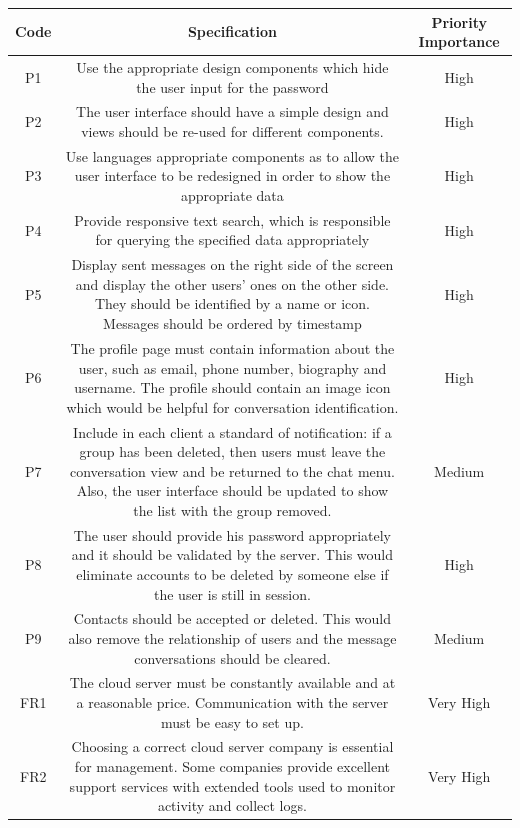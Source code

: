 \documentclass{article}
\begin{document}
\begin{table}[H]
	\centering
\begin{tabularx}{17cm}{|c|C|c|}
	\hline
	\textbf{Code} & \textbf{Specification} & \textbf{Priority Importance} \\ \hline
	\hline
		P1&Use the appropriate design components which hide the user input for  the password&High      \\ \hline
	P2&The user interface should have a simple design and views should be re-used for different components. &High          \\ \hline
	P3&Use languages appropriate components as to allow the user interface to be redesigned in order to show the appropriate data  & High     \\ \hline
	P4&Provide responsive text search, which is responsible for querying the specified data appropriately &High      \\ \hline
	P5&Display sent messages on the right side of the screen and display the other users' ones on the other side. They should be identified by a name or icon. Messages should be ordered by timestamp  & High      \\ \hline
	P6&The profile page must contain information about the user, such as email, phone number, biography and username. The profile should contain an image icon which would be helpful for conversation identification.  & High      \\ \hline
	P7& Include in each client a standard of notification: if a group has been deleted, then users must leave the conversation view and be returned to the chat menu. Also, the user interface should be updated to show the list with the group removed.   &  Medium      \\ \hline
	P8& The user should provide his password appropriately and it should be validated by the server. This would eliminate accounts to be deleted by someone else if the user is still in session. & High        \\ \hline
	P9&Contacts should be accepted or deleted. This would also remove the relationship of users and the message conversations should be cleared.     & Medium    \\ \hline
	\hline
	FR1&The cloud server must be constantly available and at a reasonable price. Communication with the server must be easy to set up. &Very High     \\ \hline
	FR2&Choosing a correct cloud server company is essential for management. Some companies provide excellent support services with extended tools used to monitor activity and collect logs.   &Very High    \\ \hline 

\end{tabularx}
\end{table}
\end{document}
